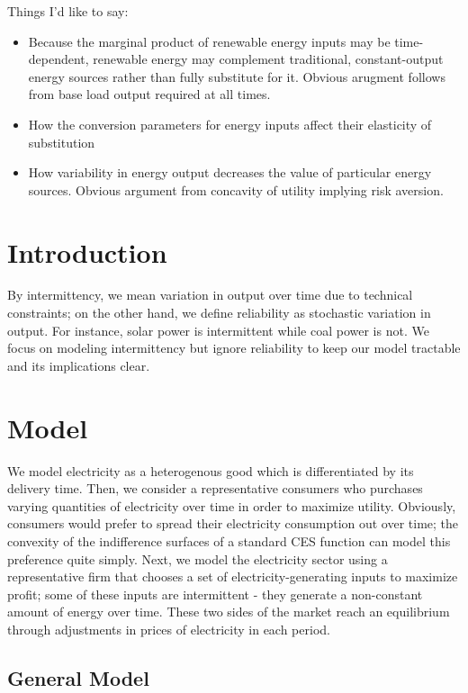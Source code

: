 \documentclass[12pt,a4paper]{extarticle}
\begin{document}
Things I'd like to say:
\begin{itemize}
	\item Because the marginal product of renewable energy inputs may be time-dependent, renewable energy may complement traditional, constant-output energy sources rather than fully substitute for it. Obvious arugment follows from base load output required at all times. 
	\item How the conversion parameters for energy inputs affect their elasticity of substitution
	\item How variability in energy output decreases the value of particular energy sources. Obvious argument from concavity of utility implying risk aversion. 
\end{itemize}

\pagebreak

\section{Introduction}

By intermittency, we mean variation in output over time due to technical constraints; on the other hand, we define reliability as stochastic variation in output. For instance, solar power is intermittent while coal power is not. We focus on modeling intermittency but ignore reliability to keep our model tractable and its implications clear. 

\section{Model}

We model electricity as a heterogenous good which is differentiated by its delivery time. Then, we consider a representative consumers who purchases varying quantities of electricity over time in order to maximize utility. Obviously, consumers would prefer to spread their electricity consumption out over time; the convexity of the indifference surfaces of a standard CES function can model this preference quite simply. Next, we model the electricity sector using a representative firm that chooses a set of electricity-generating inputs to maximize profit; some of these inputs are intermittent - they generate a non-constant amount of energy over time. These two sides of the market reach an equilibrium through adjustments in prices of electricity in each period. 

\subsection{General Model}
\end{document}
